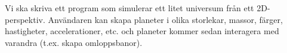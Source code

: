 Vi ska skriva ett program som simulerar ett litet universum
från ett 2D-perspektiv.
Användaren kan skapa planeter i olika
storlekar, massor, färger, hastigheter, accelerationer, etc.
och planeter kommer sedan interagera med varandra (t.ex. skapa omloppsbanor).


